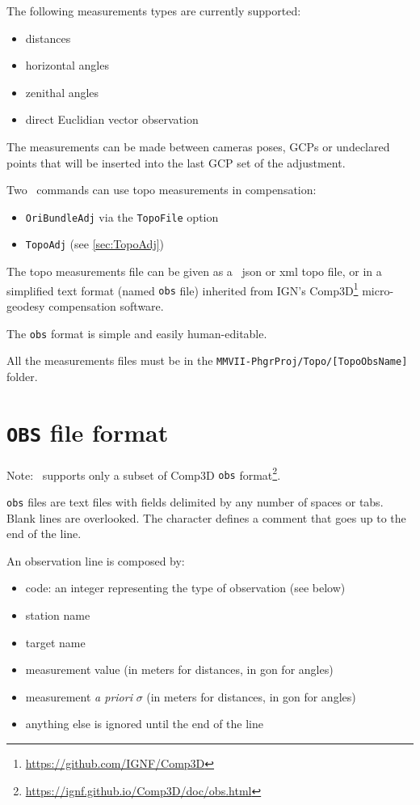 The following measurements types are currently supported:

\begin{itemize}
    \item distances
    \item horizontal angles
    \item zenithal angles
    \item direct Euclidian vector observation
\end{itemize}

The measurements can be made between cameras poses, GCPs or undeclared points that will be inserted into the last GCP set of the adjustment.



Two \CdPPP\ commands can use topo measurements in compensation:
\begin{itemize}
    \item {\tt OriBundleAdj} via the {\tt TopoFile} option
    \item {\tt TopoAdj} (see \ref{sec:TopoAdj})
\end{itemize}

The topo measurements file can be given as a \CdPPP\ json or xml topo file, or in a simplified text format (named {\tt obs} file) inherited from IGN's Comp3D\footnote{\url{https://github.com/IGNF/Comp3D}} micro-geodesy compensation software.

The {\tt obs} format is simple and easily human-editable.

All the measurements files must be in the {\tt MMVII-PhgrProj/Topo/[TopoObsName]} folder.

\section{\texttt{OBS} file format}
\label{sec:compObsFormat}

Note: \CdPPP\ supports only a subset of Comp3D {\tt obs} format\footnote{\url{https://ignf.github.io/Comp3D/doc/obs.html}}.
\vspace{0.5cm}

{\tt obs} files are text files with fields delimited by any number of spaces or tabs. Blank lines are overlooked.
The {\tt *} character defines a comment that goes up to the end of the line.

An observation line is composed by:

\begin{itemize}
    \item code: an integer representing the type of observation (see below)
    \item station name
    \item target name
    \item measurement value (in meters for distances, in gon for angles)
    \item measurement \textit{a priori} $\sigma$ (in meters for distances, in gon for angles)
    \item anything else is ignored until the end of the line
\end{itemize}

